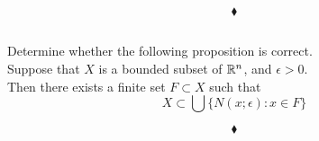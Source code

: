 $$\blacklozenge$$

\renewcommand{\thesubsection}{\thesection.\RomanNumeralCaps{7}}
\subsection{}

\begin{tcolorbox}
Determine whether the following proposition is correct.\\
Suppose that $X$ is a bounded subset of $\mathbb{R}^n$, and $\epsilon>0$.\\
Then there exists a finite set $F\subset X$  such that
$$X\subset \bigcup\{ N(x;\epsilon):x\in F\}$$
\end{tcolorbox}

$$\blacklozenge$$
